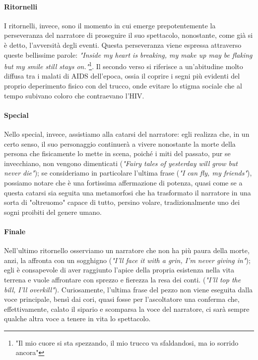 \documentclass[12pt]{article}
\begin{document}
\paragraph{Ritornelli}
I ritornelli, invece, sono il momento in cui emerge prepotentemente la perseveranza del narratore di proseguire il suo spettacolo, nonostante, come già si è detto, l'avversità degli eventi. Questa perseveranza viene espressa attraverso queste bellissime parole: \emph{"Inside my heart is breaking, my make up may be flaking but my smile still stays on."}\footnote{"Il mio cuore si sta spezzando, il mio trucco va sfaldandosi, ma io sorrido ancora"}. Il secondo verso si riferisce a un'abitudine molto diffusa tra i malati di AIDS dell'epoca, ossia il coprire i segni più evidenti del proprio deperimento fisico con del trucco, onde evitare lo stigma sociale che al tempo subivano coloro che contraevano l'HIV.

\paragraph{Special}
Nello special, invece, assistiamo alla catarsi del narratore: egli realizza che, in un certo senso, il suo personaggio continuerà a vivere nonostante la morte della persona che fisicamente lo mette in scena, poiché i miti del passato, pur se invecchiano, non vengono dimenticati (\emph{"Fairy tales of yesterday will grow but never die"}); se consideriamo in particolare l'ultima frase (\emph{"I can fly, my friends"}), possiamo notare che è una fortissima affermazione di potenza, quasi come se a questa catarsi sia seguita una metamorfosi che ha trasformato il narratore in una sorta di "oltreuomo" capace di tutto, persino volare, tradizionalmente uno dei sogni proibiti del genere umano.

\paragraph{Finale}
Nell'ultimo ritornello osserviamo un narratore che non ha più paura della morte, anzi, la affronta con un sogghigno (\emph{"I'll face it with a grin, I'm never giving in"}); egli è consapevole di aver raggiunto l'apice della propria esistenza nella vita terrena e vuole affrontare con sprezzo e fierezza la resa dei conti. (\emph{"I'll top the bill, I'll overkill"}). Curiosamente, l'ultima frase del pezzo non viene eseguita dalla voce principale, bensì dai cori, quasi fosse per l'ascoltatore una conferma che, effettivamente, calato il sipario e scomparsa la voce del narratore, ci sarà sempre qualche altra voce a tenere in vita lo spettacolo.
\end{document}
